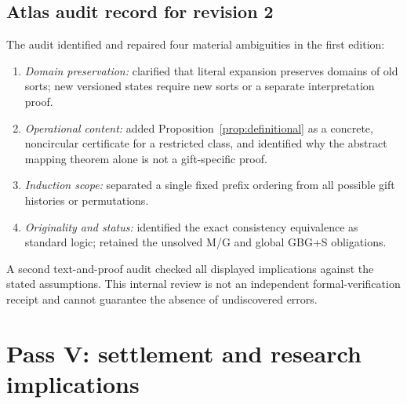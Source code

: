 \documentclass[11pt,letterpaper]{article}
\theoremstyle{definition}
\begin{document}
\subsection{Atlas audit record for revision 2}

The audit identified and repaired four material ambiguities in the first edition:
\begin{enumerate}[label=(\roman*)]
\item \emph{Domain preservation:} clarified that literal expansion preserves domains of old sorts; new versioned states require new sorts or a separate interpretation proof.
\item \emph{Operational content:} added Proposition~\ref{prop:definitional} as a concrete, noncircular certificate for a restricted class, and identified why the abstract mapping theorem alone is not a gift-specific proof.
\item \emph{Induction scope:} separated a single fixed prefix ordering from all possible gift histories or permutations.
\item \emph{Originality and status:} identified the exact consistency equivalence as standard logic; retained the unsolved M/G and global GBG+S obligations.
\end{enumerate}
A second text-and-proof audit checked all displayed implications against the stated assumptions. This internal review is not an independent formal-verification receipt and cannot guarantee the absence of undiscovered errors.

\section{Pass V: settlement and research implications}
\end{document}
